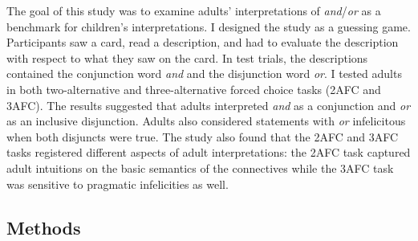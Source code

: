 \documentclass[oneside]{report}
\theoremstyle{definition}
\theoremstyle{definition}
\theoremstyle{definition}
\theoremstyle{remark}
\begin{document}
The goal of this study was to examine adults' interpretations of
\emph{and}/\emph{or} as a benchmark for children's interpretations. I
designed the study as a guessing game. Participants saw a card, read a
description, and had to evaluate the description with respect to what
they saw on the card. In test trials, the descriptions contained the
conjunction word \emph{and} and the disjunction word \emph{or}. I tested
adults in both two-alternative and three-alternative forced choice tasks
(2AFC and 3AFC). The results suggested that adults interpreted
\emph{and} as a conjunction and \emph{or} as an inclusive disjunction.
Adults also considered statements with \emph{or} infelicitous when both
disjuncts were true. The study also found that the 2AFC and 3AFC tasks
registered different aspects of adult interpretations: the 2AFC task
captured adult intuitions on the basic semantics of the connectives
while the 3AFC task was sensitive to pragmatic infelicities as well.

\subsection{Methods}\label{methods-2}
\end{document}
